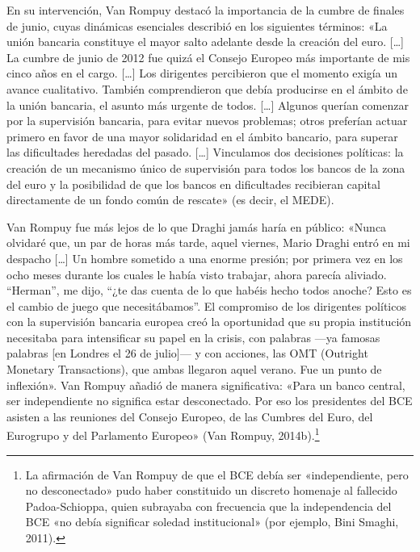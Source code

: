 \documentclass[10pt,a4paper]{article}
\begin{document}
{En su intervención, Van Rompuy destacó la importancia de la cumbre de finales de junio, cuyas dinámicas esenciales describió en los siguientes términos: «La unión bancaria constituye el mayor salto adelante desde la creación del euro. […] La cumbre de junio de 2012 fue quizá el Consejo Europeo más importante de mis cinco años en el cargo. […] Los dirigentes percibieron que el momento exigía un avance cualitativo. También comprendieron que debía producirse en el ámbito de la unión bancaria, el asunto más urgente de todos. […] Algunos querían comenzar por la supervisión bancaria, para evitar nuevos problemas; otros preferían actuar primero en favor de una mayor solidaridad en el ámbito bancario, para superar las dificultades heredadas del pasado. […] Vinculamos dos decisiones políticas: la creación de un mecanismo único de supervisión para todos los bancos de la zona del euro y la posibilidad de que los bancos en dificultades recibieran capital directamente de un fondo común de rescate» (es decir, el MEDE).

Van Rompuy fue más lejos de lo que Draghi jamás haría en público: «Nunca olvidaré que, un par de horas más tarde, aquel viernes, Mario Draghi entró en mi despacho […] Un hombre sometido a una enorme presión; por primera vez en los ocho meses durante los cuales le había visto trabajar, ahora parecía aliviado. “Herman”, me dijo, “¿te das cuenta de lo que habéis hecho todos anoche? Esto es el cambio de juego que necesitábamos”. El compromiso de los dirigentes políticos con la supervisión bancaria europea creó la oportunidad que su propia institución necesitaba para intensificar su papel en la crisis, con palabras —ya famosas palabras [en Londres el 26 de julio]— y con acciones, las OMT (Outright Monetary Transactions), que ambas llegaron aquel verano. Fue un punto de inflexión». Van Rompuy añadió de manera significativa: «Para un banco central, ser independiente no significa estar desconectado. Por eso los presidentes del BCE asisten a las reuniones del Consejo Europeo, de las Cumbres del Euro, del Eurogrupo y del Parlamento Europeo» (Van Rompuy, 2014b).\footnote{%
    La afirmación de Van Rompuy de que el BCE debía ser «independiente, pero no desconectado» pudo haber constituido un discreto homenaje al fallecido Padoa-Schioppa, quien subrayaba con frecuencia que la independencia del BCE «no debía significar soledad institucional» (por ejemplo, Bini Smaghi, 2011).
}

}
\end{document}
